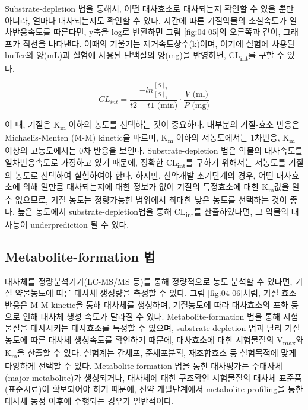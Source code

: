 \documentclass[
  11pt,
  krantz2, a4paper, twoside]{krantz}
\begin{document}
Substrate-depletion 법을 통해서, 어떤 대사효소로 대사되는지 확인할 수
있을 뿐만 아니라, 얼마나 대사되는지도 확인할 수 있다. 시간에 따른
기질약물의 소실속도가 일차반응속도를 따른다면, y축을 log로 변환하면 그림 \ref{fig:04-05}의 오른쪽과 같이, 그래프가 직선을 나타낸다. 이때의 기울기는
제거속도상수(k)이며, 여기에 실험에 사용된 buffer의 양(mL)과 실험에
사용된 단백질의 양(mg)을 반영하면, CL\textsubscript{int}를 구할 수 있다.

\begin{equation}
CL_{int} = \frac{-ln\frac{[S]_2}{[S]_1}}{t2 - t1 \text{ (min)}} \cdot \frac{V\text{ (ml)}}{P\text{ (mg)}}
\label{eq:eq04-01} 
\end{equation}

이 때, 기질은 K\textsubscript{m} 이하의 농도를 선택하는 것이 중요하다. 대부분의
기질-효소 반응은 Michaelis-Menten (M-M) kinetic을 따르며, K\textsubscript{m} 이하의
저농도에서는 1차반응, K\textsubscript{m} 이상의 고농도에서는 0차 반응을 보인다.
Substrate-depletion 법은 약물의 대사속도를 일차반응속도로 가정하고 있기
때문에, 정확한 CL\textsubscript{int}를 구하기 위해서는 저농도를 기질의 농도로 선택하여
실험하여야 한다. 하지만, 신약개발 초기단계의 경우, 어떤 대사효소에 의해
얼만큼 대사되는지에 대한 정보가 없어 기질의 특정효소에 대한 K\textsubscript{m}값을 알
수 없으므로, 기질 농도는 정량가능한 범위에서 최대한 낮은 농도를 선택하는
것이 좋다. 높은 농도에서 substrate-depletion법을 통해 CL\textsubscript{int}를
산출하였다면, 그 약물의 대사능이 underprediction 될 수 있다.

\subsection{Metabolite-formation 법}\label{metabolite-formation-uxbc95}

대사체를 정량분석기기(LC-MS/MS 등)를 통해 정량적으로 농도 분석할 수
있다면, 기질 약물농도에 따른 대사체 생성량을 측정할 수 있다. 그림 \ref{fig:04-06}처럼, 기질-효소 반응은 M-M kinetic을 통해 대사체를 생성하며,
기질농도에 따라 대사효소의 포화 등으로 인해 대사체 생성 속도가 달라질 수
있다. Metabolite-formation 법을 통해 시험물질을 대사시키는 대사효소를
특정할 수 있으며, substrate-depletion 법과 달리 기질 농도에 따른 대사체
생성속도를 확인하기 때문에, 대사효소에 대한 시험물질의 V\textsubscript{max}와 K\textsubscript{m}을
산출할 수 있다. 실험계는 간세포, 준세포분획, 재조합효소 등 실험목적에
맞게 다양하게 선택할 수 있다. Metabolite-formation 법을 통한 대사평가는
주대사체(major metabolite)가 생성되거나, 대사체에 대한 구조확인
시험물질의 대사체 표준품(표준시료)이 확보되어야 하기 때문에, 신약
개발단계에서 metabolite profiling을 통한 대사체 동정 이후에 수행되는
경우가 일반적이다.
\end{document}
